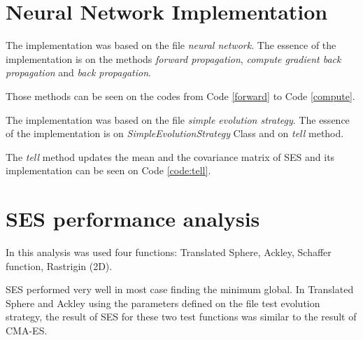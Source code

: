 \section{Neural Network Implementation}

The implementation was based on the file \textit{neural network}. The essence of the implementation is on the methods \textit{forward propagation}, \textit{compute gradient back propagation} and \textit{back propagation}.

Those methods can be seen on the codes from Code \ref{forward} to Code \ref{compute}.










The implementation was based on the file \textit{simple evolution strategy}. The essence of the implementation is on \textit{SimpleEvolutionStrategy} Class and on \textit{tell} method.

The \textit{tell} method updates the mean and the covariance matrix of SES and its implementation can be seen on Code \ref{code:tell}.



\section{SES performance analysis}

In this analysis was used four functions: Translated Sphere, Ackley, Schaffer function, Rastrigin (2D).

SES performed very well in most case finding the minimum global. In Translated Sphere and Ackley using the parameters defined on the file test evolution strategy, the result of SES for these two test functions was similar to the result of CMA-ES.

